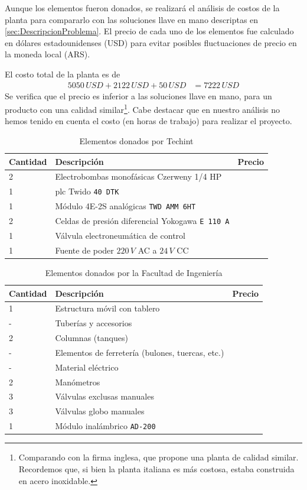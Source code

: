 Aunque los elementos fueron donados, se realizará el análisis de costos de la
planta para compararlo con las soluciones llave en mano descriptas en
\ref{sec:DescripcionProblema}.
El precio de cada uno de los elementos fue calculado en dólares estadounidenses
(USD) para evitar posibles fluctuaciones de precio en la moneda local (ARS).

El costo total de la planta es de
\begin{align}
5050\,USD + 2122\,USD + 50\,USD &= 7222\,USD
\end{align}
Se verifica que el precio es inferior a las soluciones llave en mano, para un
producto con una calidad similar\footnote{Comparando con la firma inglesa,
que propone una planta de calidad similar. Recordemos que, si bien la planta
italiana es más costosa, estaba construida en acero inoxidable.}.
Cabe destacar que en nuestro análisis no hemos tenido en cuenta el costo (en
horas de trabajo) para realizar el proyecto.
\begin{table}[!t]
\renewcommand{\arraystretch}{1.3}
\centering
\begin{tabularx}{\textwidth}{l||X||l}
\hline
\bfseries Cantidad & \bfseries Descripción &\bfseries Precio\\
\hline \hline
2& Electrobombas monofásicas Czerweny 1/4 HP &
 {\multirow{6}{*}{5050 USD}}\\
1& \gls{plc} Twido \texttt{40 DTK} &  \\
1& Módulo 4E-2S analógicas \texttt{TWD AMM 6HT}& \\
2& Celdas de presión diferencial Yokogawa \texttt{E 110 A}& \\
1& Válvula electroneumática de control & \\
1& Fuente de poder $220\,V$ AC a $24\,V$ CC& \\
\hline
\end{tabularx}
\caption{Elementos donados por Techint}
\label{tab:donacionTechint}
\end{table}

\begin{table}[!t]
\renewcommand{\arraystretch}{1.3}
\centering
\begin{tabularx}{\textwidth}{l||X||l}
\hline
\bfseries Cantidad & \bfseries Descripción & \bfseries Precio\\
\hline \hline
1& Estructura móvil con tablero&
 {\multirow{9}{*}{2122 USD}}\\
-& Tuberías y accesorios &  \\
2& Columnas (tanques) &  \\
-& Elementos de ferretería (bulones, tuercas, etc.)& \\
-& Material eléctrico &\\
2& Manómetros& \\
3& Válvulas exclusas manuales& \\
3& Válvulas globo manuales& \\
1& Módulo inalámbrico \texttt{AD-200}&\\
\hline
\end{tabularx}
\caption{Elementos donados por la Facultad de Ingeniería}
\label{tab:donacionFing}
\end{table}

